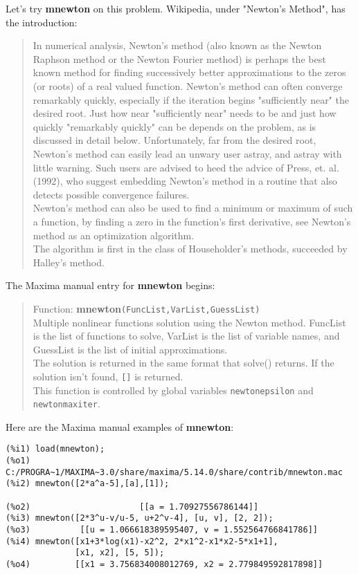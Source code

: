 \documentclass[12pt]{article}
\begin{document}
Let's try \textbf{mnewton} on this problem.
Wikipedia, under "Newton's Method",  has the introduction:

\small
\begin{quote}
In numerical analysis, Newton's method (also known as the Newton Raphson method
 or the Newton Fourier method) is perhaps the best known method for finding
 successively better approximations to the zeros (or roots) of a
 real valued function.
Newton's method can often converge remarkably quickly, especially if
  the iteration begins "sufficiently near" the desired root.
Just how near "sufficiently near" needs to be and just how quickly
  "remarkably quickly" can be depends on the problem, as is
  discussed in detail below.
Unfortunately, far from the desired root, Newton's method can easily lead
  an unwary user astray, and astray with little warning.
Such users are advised to heed the advice of Press, et. al. (1992), who
  suggest embedding Newton's method in a routine that also detects
  possible convergence failures.\\
Newton's method can also be used to find a minimum or maximum of
  such a function, by finding a zero in the function's first derivative,
  see Newton's method as an optimization algorithm.\\
The algorithm is first in the class of Householder's methods, succeeded by Halley's method.
\end{quote}
\normalsize
The Maxima manual entry for \textbf{mnewton} begins:
\small
\begin{quote}
Function: \textbf{mnewton}\verb|(FuncList,VarList,GuessList)|\\ 
Multiple nonlinear functions solution using the Newton method.
FuncList is the list of functions to solve, VarList is the list
 of variable names, and GuessList is the list of initial approximations. \\
The solution is returned in the same format that solve() returns.
If the solution isn't found, \verb|[]| is returned. \\
This function is controlled by global variables \verb|newtonepsilon|
 and \verb|newtonmaxiter|. 
\end{quote}
\normalsize

Here are the Maxima manual examples of \textbf{mnewton}:
\small
\begin{verbatim}
(%i1) load(mnewton);
(%o1) C:/PROGRA~1/MAXIMA~3.0/share/maxima/5.14.0/share/contrib/mnewton.mac
(%i2) mnewton([2*a^a-5],[a],[1]);

(%o2)                      [[a = 1.70927556786144]]
(%i3) mnewton([2*3^u-v/u-5, u+2^v-4], [u, v], [2, 2]);
(%o3)          [[u = 1.066618389595407, v = 1.552564766841786]]
(%i4) mnewton([x1+3*log(x1)-x2^2, 2*x1^2-x1*x2-5*x1+1],
              [x1, x2], [5, 5]);
(%o4)         [[x1 = 3.756834008012769, x2 = 2.779849592817898]]
\end{verbatim}
\normalsize
\end{document}
